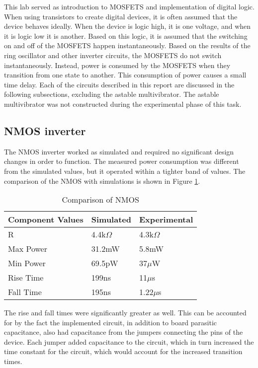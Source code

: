 

This lab served as introduction to MOSFETS and implementation of digital logic. When using transistors to create digital devices, it is often assumed that the device behaves ideally. When the device is logic high, it is one voltage, and when it is logic low it is another. Based on this logic, it is assumed that the switching on and off of the MOSFETS happen instantaneously. Based on the results of the ring oscillator and other inverter circuits, the MOSFETS do not switch instantaneously. Instead, power is consumed by the MOSFETS when they transition from one state to another. This consumption of power causes a small time delay. Each of the circuits described in this report are discussed in the following subsections, excluding the astable multivibrator. The astable multivibrator was not constructed during the experimental phase of this task.


\subsection{NMOS inverter}
The NMOS inverter worked as simulated and required no significant design changes in order to function. The measured power consumption was different from the simulated values, but it operated within a tighter band of values. The comparison of the NMOS with simulations is shown in Figure \ref{tab:expvssimNMOS}.

\begin{table}[H]
	\centering
	\caption{Comparison of NMOS}
	\label{tab:expvssimNMOS}
	\begin{tabular}{|l|l|l|}
		\hline
		Component Values & Simulated    & Experimental \\ \hline
		R                & 4.4k$\Omega$ & 4.3k$\Omega$ \\ \hline
		Max Power        & 31.2mW       & 5.8mW        \\ \hline
		Min Power        & 69.5pW       & 37$\mu$W     \\ \hline
		Rise Time        & 199ns        & 11$\mu$s     \\ \hline
		Fall Time        & 195ns        & 1.22$\mu$s   \\ \hline
	
	\end{tabular}
\end{table}
The rise and fall times were significantly greater as well. This can be accounted for by the fact the implemented circuit, in addition to board parasitic capacitance, also had capacitance from the jumpers connecting the pins of the device. Each jumper added capacitance to the circuit, which in turn increased the time constant for the circuit, which would account for the increased transition times.



